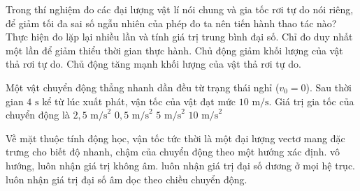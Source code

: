 	\begin{ex}%
		Trong thí nghiệm đo các đại lượng vật lí nói chung và gia tốc rơi tự do nói riêng, để giảm tối đa sai số ngẫu nhiên của phép đo ta nên tiến hành thao tác nào?
		\choice
		{\True Thực hiện đo lặp lại nhiều lần và tính giá trị trung bình đại số.}
		{Chỉ đo duy nhất một lần để giảm thiểu thời gian thực hành.}
		{Chủ động giảm khối lượng của vật thả rơi tự do.}
		{Chủ động tăng mạnh khối lượng của vật thả rơi tự do.}
	\end{ex}
	
	\begin{ex}%
		Một vật chuyển động thẳng nhanh dần đều từ trạng thái nghỉ ($v_0 = 0$). Sau thời gian $4\text{ s}$ kể từ lúc xuất phát, vận tốc của vật đạt mức $10\text{ m/s}$. Giá trị gia tốc của chuyển động là
		\choice
		{\True $2,5\text{ m/s}^2$}
		{$0,5\text{ m/s}^2$}
		{$5\text{ m/s}^2$}
		{$10\text{ m/s}^2$}
		\nobreak
	\end{ex}
	
	\begin{ex}%
		Về mặt thuộc tính động học, vận tốc tức thời là một đại lượng vectơ mang đặc trưng
		\choice
		{\True cho biết độ nhanh, chậm của chuyển động theo một hướng xác định.}
		{vô hướng, luôn nhận giá trị không âm.}
		{luôn nhận giá trị đại số dương ở mọi hệ trục.}
		{luôn nhận giá trị đại số âm dọc theo chiều chuyển động.}
	\end{ex}
	
